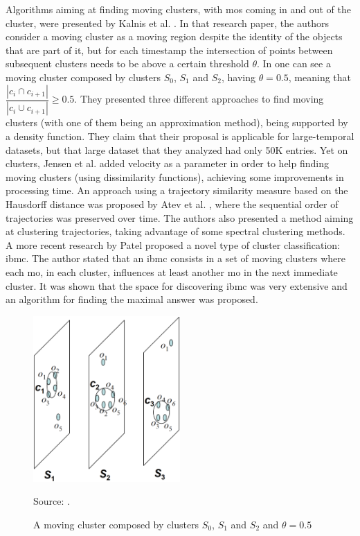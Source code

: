Algorithms aiming at finding moving clusters, with \acp{mo} coming in and out of the cluster, were presented by Kalnis
et al. \citep{movingclusters}. In that research paper, the authors consider a moving cluster as a moving region despite
the identity of the objects that are part of it, but for each timestamp the intersection of points between subsequent
clusters needs to be above a certain threshold $\theta$. In  one can see a moving cluster composed
by clusters $S_0$, $S_1$ and $S_2$, having $\theta=0.5$, meaning that $\dfrac{|c_i \cap c_{i+1}|}{|c_i \cup c_{i+1}|}
\geq 0.5$. They presented three different approaches to find moving clusters (with one of them being an approximation
method), being supported by a density function. They claim that their proposal is applicable for large-temporal
datasets, but that large dataset that they analyzed had only 50K entries. Yet on clusters, Jensen et al.
\citep{clusters3} added velocity as a parameter in order to help finding moving clusters (using dissimilarity
functions), achieving some improvements in processing time. An approach using a trajectory similarity measure based on
the Hausdorff distance was proposed by Atev et al. \citep{clusters2}, where the sequential order of trajectories was
preserved over time. The authors also presented a method aiming at clustering trajectories, taking advantage of some
spectral clustering methods. A more recent research by Patel \citep{clusters1} proposed a novel type of cluster
classification: \ac{ibmc}. The author stated that an \ac{ibmc} consists in a set of moving clusters where each \ac{mo},
in each cluster, influences at least another \ac{mo} in the next immediate cluster. It was shown that the space for
discovering \ac{ibmc} was very extensive and an algorithm for finding the maximal answer was proposed.

\begin{figure}
    \centering
    \caption{A moving cluster composed by clusters $S_0$, $S_1$ and $S_2$ and $\theta=0.5$}
    \centerline{\includegraphics[width=0.5\textwidth]{images/clusters.eps}}
    \footnotesize{Source: \citep{movingclusters}.}
    \label{fig:clusters}
\end{figure}

